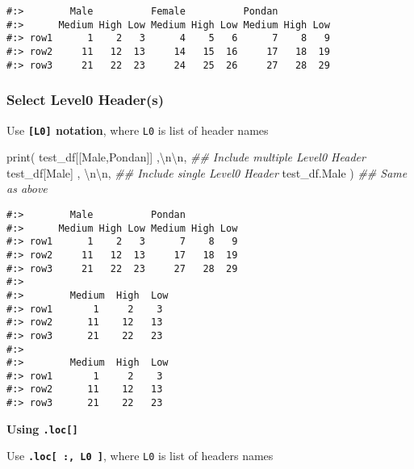 \documentclass[
]{book}
\newenvironment{Shaded}{\begin{snugshade}}{\end{snugshade}}
\newcommand{\BuiltInTok}[1]{#1}
\newcommand{\CharTok}[1]{\textcolor[rgb]{0.5,0.5,0.5}{#1}}
\newcommand{\CommentTok}[1]{\textcolor[rgb]{0.37,0.37,0.37}{\textit{#1}}}
\newcommand{\NormalTok}[1]{#1}
\newcommand{\StringTok}[1]{\textcolor[rgb]{0.5,0.5,0.5}{#1}}
\begin{document}
\begin{verbatim}
#:>        Male          Female          Pondan         
#:>      Medium High Low Medium High Low Medium High Low
#:> row1      1    2   3      4    5   6      7    8   9
#:> row2     11   12  13     14   15  16     17   18  19
#:> row3     21   22  23     24   25  26     27   28  29
\end{verbatim}

\hypertarget{select-level0-headers}{%
\subsubsection{Select Level0 Header(s)}\label{select-level0-headers}}

Use \textbf{\texttt{{[}L0{]}} notation}, where \texttt{L0} is list of header names

\begin{Shaded}
\begin{Highlighting}[]
\BuiltInTok{print}\NormalTok{( test\_df[[}\StringTok{\textquotesingle{}Male\textquotesingle{}}\NormalTok{,}\StringTok{\textquotesingle{}Pondan\textquotesingle{}}\NormalTok{]] ,}\StringTok{\textquotesingle{}}\CharTok{\textbackslash{}n\textbackslash{}n}\StringTok{\textquotesingle{}}\NormalTok{,  }\CommentTok{\#\# Include multiple Level0 Header}
\NormalTok{       test\_df[}\StringTok{\textquotesingle{}Male\textquotesingle{}}\NormalTok{] ,          }\StringTok{\textquotesingle{}}\CharTok{\textbackslash{}n\textbackslash{}n}\StringTok{\textquotesingle{}}\NormalTok{,   }\CommentTok{\#\# Include single Level0 Header}
\NormalTok{       test\_df.Male )                       }\CommentTok{\#\# Same as above}
\end{Highlighting}
\end{Shaded}

\begin{verbatim}
#:>        Male          Pondan         
#:>      Medium High Low Medium High Low
#:> row1      1    2   3      7    8   9
#:> row2     11   12  13     17   18  19
#:> row3     21   22  23     27   28  29 
#:> 
#:>        Medium  High  Low
#:> row1       1     2    3
#:> row2      11    12   13
#:> row3      21    22   23 
#:> 
#:>        Medium  High  Low
#:> row1       1     2    3
#:> row2      11    12   13
#:> row3      21    22   23
\end{verbatim}

\textbf{Using \texttt{.loc{[}{]}}}

Use \textbf{\texttt{.loc{[}\ :,\ L0\ {]}}}, where \texttt{L0} is list of headers names
\end{document}
